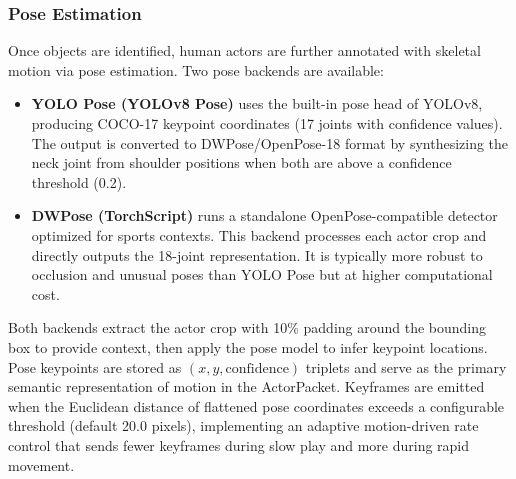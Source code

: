 \documentclass[manuscript, screen]{acmart}
\begin{document}
\subsubsection{Pose Estimation}
Once objects are identified, human actors are further annotated with skeletal motion via pose estimation. Two pose backends are available:
\begin{itemize}[topsep=0pt,itemsep=0pt,leftmargin=*]
    \item \textbf{YOLO Pose (YOLOv8 Pose)} uses the built-in pose head of YOLOv8, producing COCO-17 keypoint coordinates (17 joints with confidence values). The output is converted to DWPose/OpenPose-18 format by synthesizing the neck joint from shoulder positions when both are above a confidence threshold (0.2).
    \item \textbf{DWPose (TorchScript)} runs a standalone OpenPose-compatible detector optimized for sports contexts. This backend processes each actor crop and directly outputs the 18-joint representation. It is typically more robust to occlusion and unusual poses than YOLO Pose but at higher computational cost.
\end{itemize}
Both backends extract the actor crop with 10\% padding around the bounding box to provide context, then apply the pose model to infer keypoint locations. Pose keypoints are stored as $(x, y, \text{confidence})$ triplets and serve as the primary semantic representation of motion in the ActorPacket. Keyframes are emitted when the Euclidean distance of flattened pose coordinates exceeds a configurable threshold (default 20.0 pixels), implementing an adaptive motion-driven rate control that sends fewer keyframes during slow play and more during rapid movement.
\end{document}
